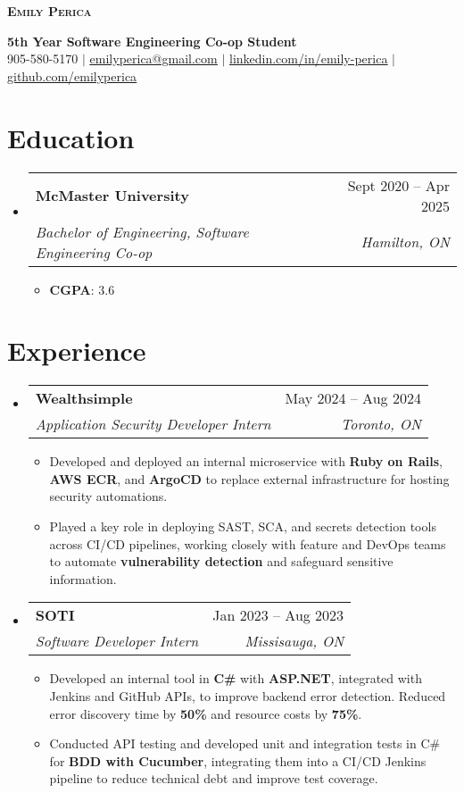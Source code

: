 \documentclass[letterpaper,11pt]{article}
\makeatletter
\newcommand{\resumeItem}[1]{
  \item\small{
    {#1 \vspace{-2pt}}
  }
}
\newcommand{\resumeSubheading}[4]{
  \vspace{-2pt}\item
    \begin{tabular*}{0.97\textwidth}[t]{l@{\extracolsep{\fill}}r}
      \textbf{#1} & #2 \\
      \textit{\small#3} & \textit{\small #4} \\
    \end{tabular*}\vspace{-7pt}
}
\newcommand{\resumeSubHeadingListStart}{\begin{itemize}[leftmargin=0.15in, label={}]}
\newcommand{\resumeSubHeadingListEnd}{\end{itemize}}
\newcommand{\resumeItemListStart}{\begin{itemize}}
\newcommand{\resumeItemListEnd}{\end{itemize}\vspace{-5pt}}
\makeatother
\begin{document}
\begin{center}
    \textbf{\Huge \scshape Emily Perica}

    \vspace{1pt}
    \textbf{\small 5th Year Software Engineering Co-op Student} \\ 
    \vspace{1pt}
    \small 905-580-5170 $|$ \href{mailto:emilyperica@gmail.com}{\underline{emilyperica@gmail.com}} $|$ 
    \href{https://www.linkedin.com/in/emily-perica/}{\underline{linkedin.com/in/emily-perica}} $|$
    \href{https://github.com/emilyperica}{\underline{github.com/emilyperica}}
\end{center}


\section{Education}

\resumeSubHeadingListStart
  \resumeSubheading{McMaster University}{Sept 2020 -- Apr 2025}{Bachelor of Engineering, Software Engineering Co-op}{Hamilton, ON}
    \resumeItemListStart
      \resumeItem{\textbf{CGPA}: 3.6}
    \resumeItemListEnd
\resumeSubHeadingListEnd


\section{Experience}

\resumeSubHeadingListStart
  \resumeSubheading{Wealthsimple}{May 2024 -- Aug 2024}{Application Security Developer Intern}{Toronto, ON}
    \resumeItemListStart
      \resumeItem{Developed and deployed an internal microservice with \textbf{Ruby on Rails}, \textbf{AWS ECR}, and \textbf{ArgoCD} to replace external infrastructure for hosting security automations.}
      \resumeItem{Played a key role in deploying SAST, SCA, and secrets detection tools across CI/CD pipelines, working closely with feature and DevOps teams to automate \textbf{vulnerability detection} and safeguard sensitive information.}
    \resumeItemListEnd
  \resumeSubheading{SOTI}{Jan 2023 -- Aug 2023}{Software Developer Intern}{Missisauga, ON}
    \resumeItemListStart
      \resumeItem{Developed an internal tool in \textbf{C\#} with \textbf{ASP.NET}, integrated with Jenkins and GitHub APIs, to improve backend error detection. Reduced error discovery time by \textbf{50\%} and resource costs by \textbf{75\%}.}
      \resumeItem{Conducted API testing and developed unit and integration tests in C\# for \textbf{BDD with Cucumber}, integrating them into a CI/CD Jenkins pipeline to reduce technical debt and improve test coverage.}
    \resumeItemListEnd
\resumeSubHeadingListEnd
\end{document}

